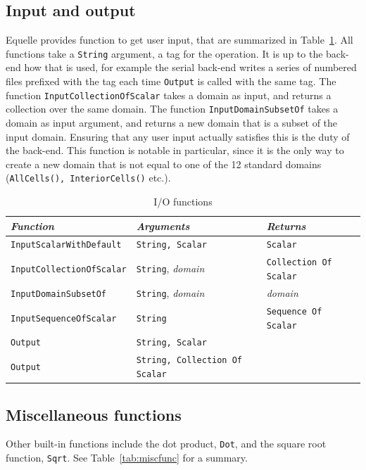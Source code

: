 \documentclass[11pt]{article}
\newcommand{\code}[1]{\texttt{#1}}
\begin{document}
\subsection{Input and output}

Equelle provides function to get user input, that are summarized in
Table~\ref{tab:iofunc}. All functions take a \code{String} argument, a tag for the
operation. It is up to the back-end how that is used, for example the serial back-end
writes a series of numbered files prefixed with the tag each time \code{Output} is called
with the same tag. The function \code{InputCollectionOfScalar} takes a domain as input,
and returns a collection over the same domain. The function \code{InputDomainSubsetOf}
takes a domain as input argument, and returns a new domain that is a subset of the input
domain. Ensuring that any user input actually satisfies this is the duty of the
back-end. This function is notable in particular, since it is the only way to create a new
domain that is not equal to one of the 12 standard domains (\code{AllCells(),
InteriorCells()} etc.).

\begin{table}
\begin{tabular}{l|l|l}
{\em Function} & {\em Arguments} & {\em Returns} \\
\hline
\code{InputScalarWithDefault} & \code{String, Scalar} & \code{Scalar} \\
\code{InputCollectionOfScalar} & \code{String}, {\em domain} & \code{Collection Of Scalar} \\
\code{InputDomainSubsetOf} & \code{String}, {\em domain} & {\em domain} \\
\code{InputSequenceOfScalar} & \code{String} & \code{Sequence Of Scalar} \\
\code{Output} & \code{String, Scalar} & \\
\code{Output} & \code{String, Collection Of Scalar} & \\
\end{tabular}
\caption{I/O functions}
\label{tab:iofunc}
\end{table}

\subsection{Miscellaneous functions}

Other built-in functions include the dot product, \code{Dot}, and the square root
function, \code{Sqrt}. See Table~\ref{tab:miscfunc} for a summary.
\end{document}
